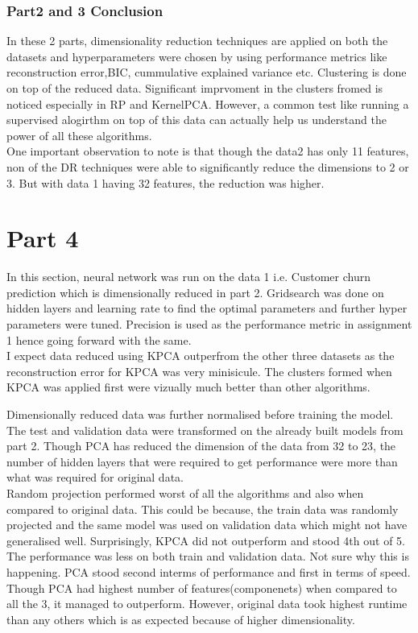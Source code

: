 \documentclass[12pt]{article}
\begin{document}
\subsubsection*{Part2 and 3 Conclusion}
In these 2 parts, dimensionality reduction techniques are applied on both the datasets and hyperparameters were chosen by using performance metrics like reconstruction error,BIC, cummulative explained variance etc. Clustering is done on top of the reduced data. Significant imprvoment in the clusters fromed is noticed especially in RP and KernelPCA. However, a common test like running  a supervised alogirthm on top of this data can actually help us understand the   power of all these algorithms.\\
One important observation to note is that though the data2 has only 11 features, non of the DR techniques were able to significantly reduce the dimensions to 2 or 3. But with data 1 having 32 features, the reduction was higher.


\section{Part 4}
In this section, neural network was run on the data 1 i.e. Customer churn prediction which is dimensionally reduced in part 2. Gridsearch was done on hidden layers and learning rate to find the optimal parameters and further hyper parameters were tuned. Precision is used as the performance metric in assignment 1 hence going forward with the same.\\

 I expect data reduced using KPCA outperfrom the other three datasets as the reconstruction error for KPCA was very minisicule. The clusters formed when KPCA was applied first were vizually much better than other algorithms.


Dimensionally reduced data was further normalised before training the model. The test and validation data were transformed on the already built models from part 2. Though PCA has reduced the dimension of the data from 32 to 23, the number of hidden layers that were required to get performance were more than what was required for original data. \\

Random projection performed worst of all the algorithms and also when compared to original data. This could be because, the train data was randomly projected and the same model was used on validation data which might not have generalised well. Surprisingly, KPCA did not outperform and stood 4th out of 5. The performance was less on both train and validation data. Not sure why this is happening. PCA stood second interms of performance and first in terms of speed. Though PCA had highest number of features(componenets) when compared to all the 3, it managed to outperform. However, original data took highest runtime than any others which is as expected because of higher dimensionality.
\end{document}
